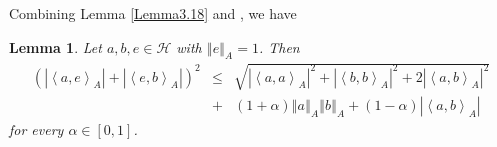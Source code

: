 \documentclass{article}
\newcommand{\bra}[1]{\left(#1\right)}
\newcommand{\seqA}[1]{{\left<#1\right>}_{A}}
\newcommand{\normA}[1]{{\left\Vert#1\right\Vert}_{A}}
\newcommand{\abs}[1]{\left\vert#1\right\vert}
\newcommand {\h}{\mathcal{H}}
\newtheorem{lemma}[theorem]{Lemma}
\begin{document}
Combining Lemma \ref{Lemma3.18} and \cite[Lemma 2.5]{QHB}, we have
\begin{lemma}\label{Comb1} Let $a,b,e\in\h$ with $\normA{e}=1$. Then
\begin{eqnarray}\label{COmb-A1}
 \bra{\abs{\seqA{a,e}}+\abs{\seqA{e,b}}}^2 &\leq&\sqrt{\abs{\seqA{a,a}}^2+\abs{\seqA{b,b}}^2+2\abs{\seqA{a,b}}^2}\nonumber  \\
   &+& (1+\alpha)\normA{a}\normA{b}+(1-\alpha)\abs{\seqA{a,b}}
\end{eqnarray}
 for every $\alpha\in [0,1]$.
\end{lemma}
\end{document}

